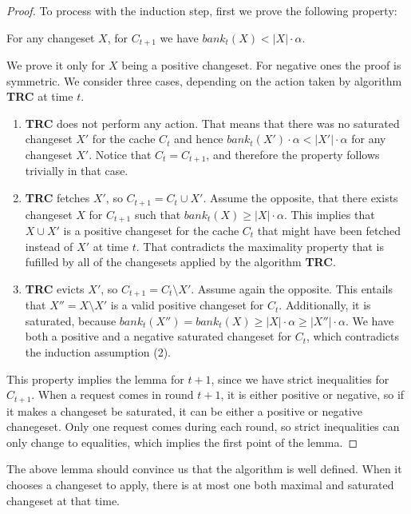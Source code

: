 \begin{proof}
To process with the induction step, first we prove the following property:
\begin{property} For any changeset $X$, for $C_{t+1}$ we have $bank_t(X) < |X|
\cdot \alpha$.  \end{property} We prove it only for $X$ being a positive
changeset. For negative ones the proof is symmetric. We consider three cases,
depending on the action taken by algorithm \textbf{TRC} at time $t$.
\begin{enumerate} \item \textbf{TRC} does not perform any action. That means
that there was no saturated changeset $X'$ for the cache $C_t$ and hence
$bank_t(X') \cdot \alpha < |X'| \cdot \alpha$ for any changeset $X'$. Notice 
that $C_t = C_{t+1}$, and therefore the property follows trivially in that case.  \item
\textbf{TRC} fetches $X'$, so $C_{t+1} = C_t \cup X'$. Assume the opposite, that
there exists changeset $X$ for $C_{t+1}$ such that $bank_t(X) \geq |X| \cdot
\alpha$. This implies that $X \cup X'$ is a positive changeset for the cache
$C_t$ that might have been fetched instead of $X'$ at time $t$. That
contradicts the maximality property that is fufilled by all of the changesets
applied by the algorithm \textbf{TRC}.  \item \textbf{TRC} evicts $X'$, so
$C_{t+1} = C_t \setminus X'$. Assume again the opposite. This entails that
$X'' = X \setminus X'$ is a valid positive changeset for $C_t$. Additionally, it
is saturated, because $bank_t(X'') = bank_t(X) \geq |X| \cdot \alpha \geq |X''|
\cdot \alpha$. We have both a positive and a negative saturated changeset for
$C_t$, which contradicts the induction assumption (2).  \end{enumerate} This
property implies the lemma for $t+1$, since we have strict inequalities for
$C_{t+1}$. When a request comes in round $t+1$, it is either positive or negative,
so if it makes a changeset be saturated, it can be either a positive or negative
chanegeset. Only one request comes during each round, so strict inequalities
can only change to equalities, which implies the first point of the lemma.
\end{proof} The above lemma should convince us that the algorithm is
well defined. When it chooses a changeset to apply, there is at most one both
maximal and saturated changeset at that time.

